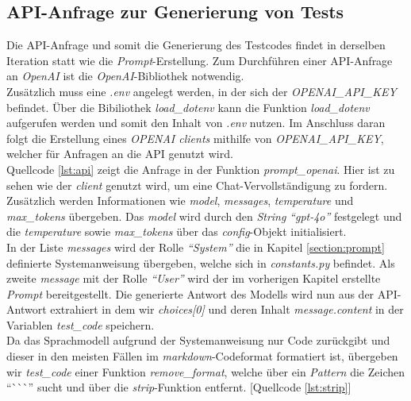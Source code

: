 \subsection{API-Anfrage zur Generierung von Tests}
Die API-Anfrage und somit die Generierung des Testcodes findet in derselben Iteration statt wie die \textit{Prompt}-Erstellung. Zum Durchführen einer API-Anfrage an \textit{OpenAI} ist die \textit{OpenAI}-Bibliothek notwendig.\\ Zusätzlich muss eine \textit{.env} angelegt werden, in der sich der \textit{OPENAI\_API\_KEY} befindet. Über die Bibiliothek \textit{load\_dotenv} kann die Funktion \textit{load\_dotenv} aufgerufen werden und somit den Inhalt von \textit{.env} nutzen. Im Anschluss daran folgt die Erstellung eines \textit{OPENAI clients} mithilfe von \textit{OPENAI\_API\_KEY}, welcher für Anfragen an die API genutzt wird. \\Quellcode \ref{lst:api} zeigt die Anfrage in der Funktion \textit{prompt\_openai}. Hier ist zu sehen wie der \textit{client} genutzt wird, um eine Chat-Vervollständigung zu fordern. \\
\vspace{-.3cm}
Zusätzlich werden Informationen wie \textit{model}, \textit{messages}, \textit{temperature} und \textit{max\_tokens} übergeben. Das \textit{model} wird durch den \textit{String} \textit{``gpt-4o''} festgelegt und die \textit{temperature} sowie \textit{max\_tokens} über das \textit{config}-Objekt initialisiert.\\ In der Liste \textit{messages} wird der Rolle \textit{``System''} die in Kapitel \ref{section:prompt} definierte Systemanweisung übergeben, welche sich in \textit{constants.py} befindet. Als zweite \textit{message} mit der Rolle \textit{``User''} wird der im vorherigen Kapitel erstellte \textit{Prompt} bereitgestellt. Die generierte Antwort des Modells wird nun aus der API-Antwort extrahiert in dem wir \textit{choices[0]} und deren Inhalt \textit{message.content} in der Variablen \textit{test\_code} speichern.\\ Da das Sprachmodell aufgrund der 
Systemanweisung nur Code zurückgibt und dieser in den meisten Fällen im \textit{markdown}-Codeformat formatiert ist, übergeben wir \textit{test\_code} einer Funktion \textit{remove\_format}, welche über ein \textit{Pattern} die Zeichen ``\`{}\`{}\`{}'' sucht und über die \textit{strip}-Funktion entfernt. [Quellcode \ref{lst:strip}]\\
\vspace{-.3cm}


